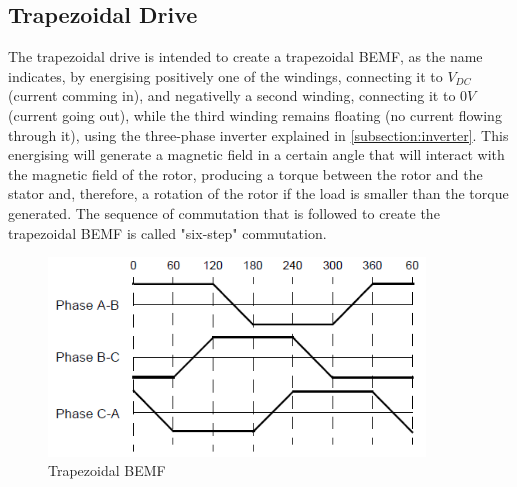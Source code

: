 \subsection{Trapezoidal Drive}\label{subsection:trapdrive}


The trapezoidal drive is intended to create a trapezoidal \ac{BEMF}, as the name indicates, by energising positively one of the windings, connecting it to $V_{DC}$ (current comming in), and negativelly a second winding, connecting it to $0V$ (current going out), while the third winding remains floating (no current flowing through it), using the three-phase inverter explained in \ref{subsection:inverter}. This energising will generate a magnetic field in a certain angle that will interact with the magnetic field of the rotor, producing a torque between the rotor and the stator and, therefore, a rotation of the rotor if the load is smaller than the torque generated. The sequence of commutation that is followed to create the trapezoidal \ac{BEMF} is called "six-step" commutation. 


\begin{figure}[htbp]
\centering
\includegraphics[width=10cm]{Images/trapezoidal_BEMF.png} 
\caption[Trapezoidal BEMF]{Trapezoidal BEMF}
\label{fig:trap_bemf}
\end{figure}


